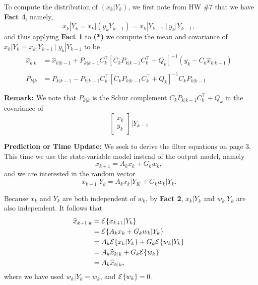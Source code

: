 \documentclass[letterpaper]{article}
\newcommand{\Expectof}[1]{{\cal E} \{ #1 \}}
\newcommand{\ExpectofGiven}[2]{{\cal E} \{ #1 | #2 \}}
\begin{document}
To compute the distribution of $(x_k| Y_k)$, we first note from HW \#7 that we have \textbf{Fact 4}, namely,
$$ x_k| Y_k = x_k\bigg| (y_k Y_{k-1}) =  x_k|Y_{k-1} ~\bigg|~ y_k|Y_{k-1},$$
and thus applying \textbf{Fact 1}  to \textbf{(*)}
we compute the mean and covariance of $x_k \bigg| Y_k = x_k|Y_{k-1} ~\bigg|~ y_k|Y_{k-1}$ to be
\begin{align*}
\widehat{x}_{k|k}&=  \widehat{x}_{k|k-1} + P_{k|k-1}  C_k^\top \left[C_k P_{k|k-1} C_k^\top  + Q_k \right]^{-1} \left( y_k - C_k   \widehat{x}_{k|k-1} \right) \\
& \\
P_{k|k} &= P_{k|k-1} - P_{k|k-1} C_k^\top   \left[C_k P_{k|k-1} C_k^\top  + Q_k \right]^{-1} C_k  P_{k|k-1}
\end{align*}

\textbf{Remark:} We note that $P_{k|k}$ is the Schur complement $C_k P_{k|k-1} C_k^\top  + Q_k$ in the covariance of  $$ \left[ \begin{array}{c} x_k\\y_k \end{array} \right] | Y_{k-1}$$


\newpage

\noindent  \textbf{Prediction or Time Update:}   We seek to derive the filter equations on page 3. This time we use the state-variable model instead of the output model, namely
$$x_{k+1} = A_k x_k + G_k w_k,$$
and we are interested in the random vector
$$x_{k+1} | Y_k = A_k x_k|Y_K + G_kw_k |Y_k.$$

Because $x_k$ and $Y_k$ are both independent of $w_k$, by \textbf{Fact 2}, $x_k| Y_k$ and $w_k | Y_k$ are also independent. It follows that
\begin{align*}
\widehat{x}_{k+1|k}&=    \ExpectofGiven{x_{k+1}}{Y_k} \\
& =\ExpectofGiven{A_k x_k + G_k w_k}{Y_k} \\
& = A_k \ExpectofGiven{ x_k} {Y_k}  + G_k  \ExpectofGiven{ w_k}{Y_k} \\
&=  A_k \widehat{x}_{k|k}  +  G_k \Expectof{w_k} \\
& = A_k \widehat{x}_{k|k},
\end{align*}
where we have used $w_k | Y_k = w_k$, and $\Expectof{w_k}=0$.
\end{document}
